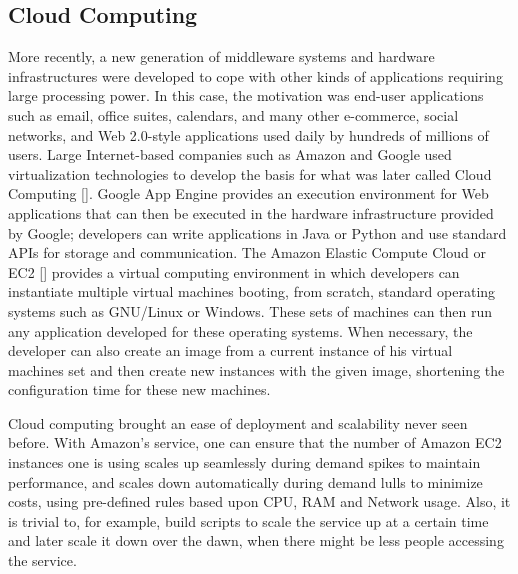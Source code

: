 \subsection{Cloud Computing}
More recently, a new generation of middleware systems and hardware infrastructures were developed to cope with other kinds of applications requiring large processing power. In this case, the motivation was end-user applications such as email, office suites, calendars, and many other e-commerce, social networks, and Web 2.0-style applications used daily by hundreds of millions of users. Large Internet-based companies such as Amazon and Google used virtualization technologies to develop the basis for what was later called Cloud Computing [\citet{ZCB10}]. Google App Engine provides an execution environment for Web applications that can then be executed in the hardware infrastructure provided by Google; developers can write applications in Java or Python and use standard APIs for storage and communication.  The Amazon Elastic Compute Cloud or EC2 [\citet{EC2}] provides a virtual computing environment in which developers can instantiate multiple virtual machines booting, from scratch, standard operating systems such as GNU/Linux or Windows. These sets of machines can then run any application developed for these operating systems. When necessary, the developer can also create an image from a current instance of his virtual machines set and then create new instances with the given image, shortening the configuration time for these new machines.

Cloud computing brought an ease of deployment and scalability never seen before. With Amazon's service, one can ensure that the number of Amazon EC2 instances one is using scales up seamlessly during demand spikes to maintain performance, and scales down automatically during demand lulls to minimize costs, using pre-defined rules based upon CPU, RAM and Network usage. Also, it is trivial to, for example, build scripts to scale the service up at a certain time and later scale it down over the dawn, when there might be less people accessing the service.

